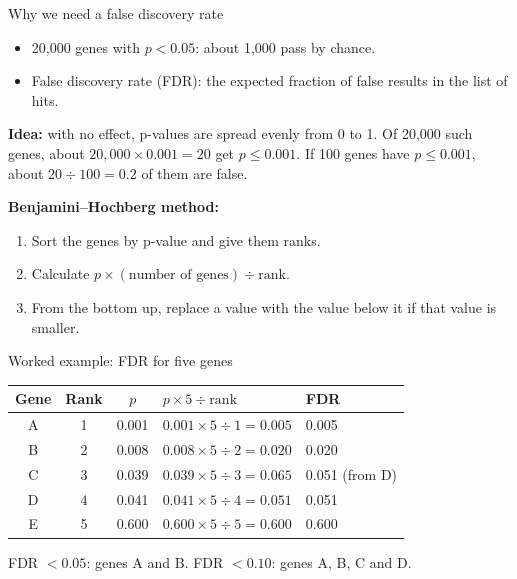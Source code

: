 \documentclass[aspectratio=169,11pt]{beamer}
\begin{document}

\begin{frame}{Why we need a false discovery rate}
\small
\begin{itemize}
\item 20{,}000 genes with $p < 0.05$: about 1{,}000 pass by chance.
\item \alert{False discovery rate} (FDR): the expected fraction of false
  results in the list of hits.
\end{itemize}
\textbf{Idea:} with no effect, p-values are spread evenly from 0 to 1. Of
20{,}000 such genes, about $20{,}000 \times 0.001 = 20$ get $p \le 0.001$.
If 100 genes have $p \le 0.001$, about $20 \div 100 = 0.2$ of them are false.

\textbf{Benjamini--Hochberg method:}
\begin{enumerate}
\item Sort the genes by p-value and give them ranks.
\item Calculate $p \times (\text{number of genes}) \div \text{rank}$.
\item From the bottom up, replace a value with the value below it if that
  value is smaller.
\end{enumerate}
\end{frame}

\begin{frame}{Worked example: FDR for five genes}
\begin{worked}[ 20]
\centering\small
\begin{tabular}{@{}cccll@{}}
\toprule
Gene & Rank & $p$ & $p \times 5 \div \text{rank}$ & FDR\\
\midrule
A & 1 & 0.001 & $0.001 \times 5 \div 1 = 0.005$ & 0.005\\
B & 2 & 0.008 & $0.008 \times 5 \div 2 = 0.020$ & 0.020\\
C & 3 & 0.039 & $0.039 \times 5 \div 3 = 0.065$ & 0.051 (from D)\\
D & 4 & 0.041 & $0.041 \times 5 \div 4 = 0.051$ & 0.051\\
E & 5 & 0.600 & $0.600 \times 5 \div 5 = 0.600$ & 0.600\\
\bottomrule
\end{tabular}

\raggedright
FDR $< 0.05$: genes A and B. \quad FDR $< 0.10$: genes A, B, C and D.
\end{worked}
\end{frame}
\end{document}

